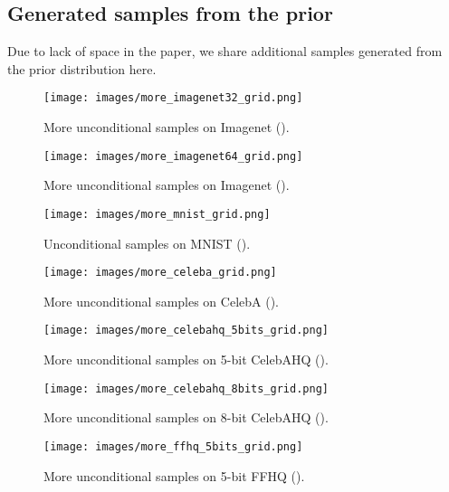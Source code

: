 \documentclass{article}
\begin{document}
\FloatBarrier
\subsection{Generated samples from the prior}\label{additional_prior_samples_appendix}
Due to lack of space in the paper, we share additional samples generated from the prior distribution here.

\begin{figure}[!htb]
    \centering
    \texttt{[image: images/more\_imagenet32\_grid.png]}
    \caption{More unconditional samples on Imagenet  ().}
    \label{more_imagenet32_fig}
\end{figure}

\begin{figure}[!htb]
    \centering
    \texttt{[image: images/more\_imagenet64\_grid.png]}
    \caption{More unconditional samples on Imagenet  ().}
    \label{more_imagenet64_fig}
\end{figure}

\begin{figure}[!htb]
    \centering
    \texttt{[image: images/more\_mnist\_grid.png]}
    \caption{Unconditional samples on MNIST ().}
    \label{more_mnist_fig}
\end{figure}

\begin{figure}[!htb]
    \centering
    \texttt{[image: images/more\_celeba\_grid.png]}
    \caption{More unconditional samples on CelebA  ().}
    \label{more_celeba64_fig}
\end{figure}

\begin{figure}[!htb]
    \centering
    \texttt{[image: images/more\_celebahq\_5bits\_grid.png]}
    \caption{More unconditional samples on 5-bit CelebAHQ  ().}
    \label{more_celebahq256_5bits_fig}
\end{figure}

\begin{figure}[!htb]
    \centering
    \texttt{[image: images/more\_celebahq\_8bits\_grid.png]}
    \caption{More unconditional samples on 8-bit CelebAHQ  ().}
    \label{more_celebahq256_8bits_fig}
\end{figure}

\begin{figure}[!htb]
    \centering
    \texttt{[image: images/more\_ffhq\_5bits\_grid.png]}
    \caption{More unconditional samples on 5-bit FFHQ  ().}
    \label{more_ffhq256_5bits_fig}
\end{figure}
\end{document}

